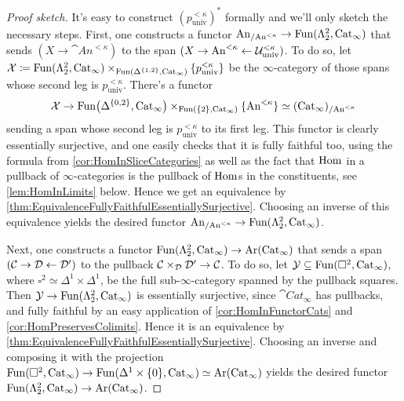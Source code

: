 \begin{proof}[Proof sketch]
	It's easy to construct $(p_\mathrm{univ}^{<\kappa})^*$ formally and we'll only sketch the necessary steps. First, one constructs a functor $\mathrm{An}_{/\mathrm{An}^{<\kappa}}\rightarrow \operatorname{Fun}(\Lambda_2^2,\mathrm{Cat}_\infty)$ that sends $(X\rightarrow \cat{An}^{<\kappa})$ to the span $(X\rightarrow \mathrm{An}^{<\kappa}\leftarrow \mathcal{U}_\mathrm{univ}^{<\kappa})$. To do so, let $\mathcal{X}\coloneqq\operatorname{Fun}(\Lambda_2^2,\mathrm{Cat}_\infty)\times_{\operatorname{Fun}(\Delta^{\{1,2\}},\mathrm{Cat}_\infty)}\{p_\mathrm{univ}^{<\kappa}\}$ be the $\infty$-category of those spans whose second leg is $p_\mathrm{univ}^{<\kappa}$. There's a functor
	\begin{equation*}
		\mathcal{X}\rightarrow \operatorname{Fun}\bigl(\Delta^{\{0,2\}},\mathrm{Cat}_\infty\bigr)\times_{\operatorname{Fun}(\{2\},\mathrm{Cat}_\infty)}\{\mathrm{An}^{<\kappa}\}\simeq (\mathrm{Cat}_\infty)_{/\mathrm{An}^{<\kappa}}
	\end{equation*}
	sending a span whose second leg is $p_\mathrm{univ}^{<\kappa}$ to its first leg. This functor is clearly essentially surjective, and one easily checks that it is fully faithful too, using the formula from \cref{cor:HomInSliceCategories} as well as the fact that $\operatorname{Hom}$ in a pullback of $\infty$-categories is the pullback of $\operatorname{Hom}$s in the constituents, see \cref{lem:HomInLimits} below. Hence we get an equivalence by \cref{thm:EquivalenceFullyFaithfulEssentiallySurjective}. Choosing an inverse of this equivalence yields the desired functor $\mathrm{An}_{/\mathrm{An}^{<\kappa}}\rightarrow \operatorname{Fun}(\Lambda_2^2,\mathrm{Cat}_\infty)$.
	
	Next, one constructs a functor $\operatorname{Fun}(\Lambda_2^2,\mathrm{Cat}_\infty)\rightarrow \operatorname{Ar}(\mathrm{Cat}_\infty)$ that sends a span $(\mathcal{C}\rightarrow {\mathcal{D}}\leftarrow \mathcal{D}')$ to the pullback $\mathcal{C}\times_{\mathcal{D}}\mathcal{D}'\rightarrow \mathcal{C}$. To do so, let $\mathcal{Y}\subseteq \operatorname{Fun}(\square^2,\mathrm{Cat}_\infty)$, where $\square^2\simeq \Delta^1\times\Delta^1$, be the full sub-$\infty$-category spanned by the pullback squares. Then $\mathcal{Y}\rightarrow \operatorname{Fun}(\Lambda_2^2,\mathrm{Cat}_\infty)$ is essentially surjective, since $\cat{Cat}_\infty$ has pullbacks, and fully faithful by an easy application of \cref{cor:HomInFunctorCats} and \cref{cor:HomPreservesColimits}. Hence it is an equivalence by \cref{thm:EquivalenceFullyFaithfulEssentiallySurjective}. Choosing an inverse and composing it with the projection $\operatorname{Fun}(\square^2,\mathrm{Cat}_\infty)\rightarrow \operatorname{Fun}(\Delta^1\times\{0\},\mathrm{Cat}_\infty)\simeq \operatorname{Ar}(\mathrm{Cat}_\infty)$ yields the desired functor $\operatorname{Fun}(\Lambda_2^2,\mathrm{Cat}_\infty)\rightarrow \operatorname{Ar}(\mathrm{Cat}_\infty)$.
	

\end{proof}
